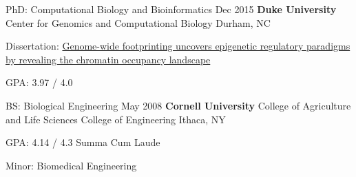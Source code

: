
\begin{resentries}

  \resentry
	{PhD: Computational Biology and Bioinformatics}
	{Dec 2015}
	{\textbf{Duke University} \xspace \bullet \xspace \xspace Center for Genomics and Computational Biology}
	{Durham, NC}
    {
      \begin{cvitems} %
		\item{Dissertation: \href{https://dukespace.lib.duke.edu/dspace/handle/10161/11371}{\color{blue} Genome-wide footprinting uncovers epigenetic regulatory paradigms by revealing the chromatin occupancy landscape}}
		\item{GPA: 3.97 / 4.0}
      \end{cvitems}
    }

  \resentry
	{BS: Biological Engineering}
	{May 2008}
	{\textbf{Cornell University} \xspace \bullet \xspace \xspace College of Agriculture and Life Sciences \xspace \bullet \xspace \xspace College of Engineering}
	{Ithaca, NY}
    {
      \begin{cvitems} %
		\item {GPA: 4.14 / 4.3 \xspace \bullet \xspace \xspace Summa Cum Laude}
		\item {Minor: Biomedical Engineering}
      \end{cvitems}
    }
\end{resentries}
